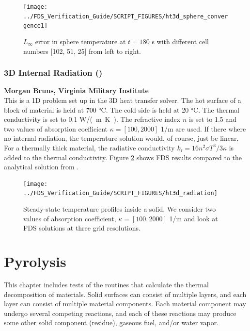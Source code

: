 \documentclass[11pt]{book}
\begin{document}
\begin{figure}[ht]
\centering
\texttt{[image: ../FDS\_Verification\_Guide/SCRIPT\_FIGURES/ht3d\_sphere\_convergence1]}
\caption[The  convergence]{$L_{\infty}$ error in sphere temperature at $t=180$ s with different cell numbers [102, 51, 25] from left to right.}
\label{fig:ht3d_sphere_conv}
\end{figure}

\subsection{3D Internal Radiation (\texorpdfstring{}{ht3d\_radiation})}
\label{ht3d_radiation}

\textbf{Morgan Bruns, Virginia Military Institute}\\

This is a 1D problem set up in the 3D heat transfer solver.  The hot surface of a block of material is held at 700 \si{\degreeCelsius}.  The cold side is held at 20 \si{\degreeCelsius}.  The thermal conductivity is set to 0.1 \si{W/(m.K)}.  The refractive index $n$ is set to 1.5 and two values of absorption coefficient $\kappa = [100, 2000]$ 1/m are used.  If there where no internal radiation, the temperature solution would, of course, just be linear.  For a thermally thick material, the radiative conductivity $k_{\mathrm{r}} = 16 n^2 \sigma T^3 / 3 \kappa$ is added to the thermal conductivity.  Figure \ref{fig:ht3d_radiation} shows FDS results compared to the analytical solution from \cite{Modest:2003}.

\begin{figure}[ht]
\centering
\texttt{[image: ../FDS\_Verification\_Guide/SCRIPT\_FIGURES/ht3d\_radiation]}
\caption[The  solution]{Steady-state temperature profiles inside a solid.  We consider two values of absorption coefficient, $\kappa = [100, 2000]$ 1/m and look at FDS solutions at three grid resolutions.}
\label{fig:ht3d_radiation}
\end{figure}



\chapter{Pyrolysis}

This chapter includes tests of the routines that calculate the thermal decomposition of materials. Solid surfaces can consist of multiple layers, and each layer can consist of multiple material components. Each material component may undergo several competing reactions, and each of these reactions may produce some other solid component (residue), gaseous fuel, and/or water vapor.
\end{document}
